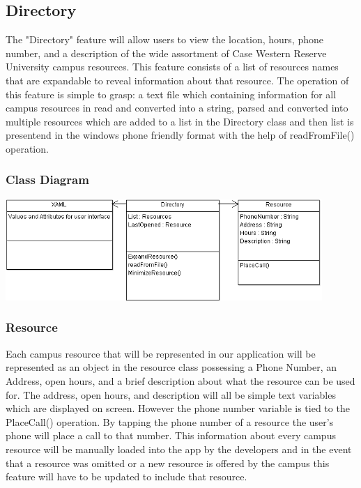 \documentclass[pdftex,12pt,letter]{article}
\begin{document}
\subsection{Directory}
The "Directory" feature will allow users to view the location, hours, phone number, and a description of the wide assortment of Case Western Reserve University campus resources. This feature consists of a list of resources names that are expandable to reveal information about that resource. The operation of this feature is simple to grasp: a text file which containing information for all campus resources in read and converted into a string, parsed and converted into multiple resources which are added to a list in the Directory class and then list is presentend in the windows phone friendly format with the help of readFromFile() operation.
\subsubsection{Class Diagram}
\begin{flushleft}
\includegraphics[width=120mm]{DirectoryCD.png}
\end{flushleft}
\subsubsection{Resource}
Each campus resource that will be represented in our application will be represented as an object in the resource class possessing a Phone Number, an Address, open hours, and a brief description about what the resource can be used for. The address, open hours, and description will all be simple text variables which are displayed on screen. However the phone number variable is tied to the PlaceCall() operation. By tapping the phone number of a resource the user’s phone will place a call to that number. This information about every campus resource will be manually loaded into the app by the developers and in the event that a resource was omitted or a new resource is offered by the campus this feature will have to be updated to include that resource. 
\end{document}

